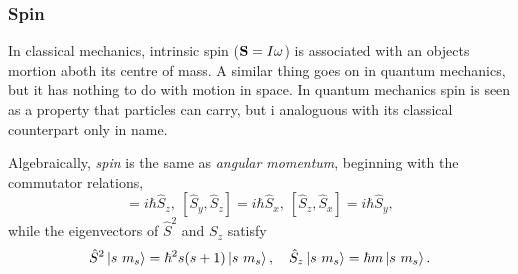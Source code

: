     \subsubsection{Spin}

    In classical mechanics, intrinsic spin ($\vb{S} = I\omega$) is associated with
    an objects mortion aboth its centre of mass. A similar thing goes on in quantum 
    mechanics, but it has nothing to do with motion in space. In quantum mechanics spin 
    is seen as a property that particles can carry, but i analoguous with its classical 
    counterpart only in name.

    Algebraically, \emph{spin} is the same as \emph{angular momentum}, beginning with 
    the commutator relations,
    \begin{equation}
        [\hat{S}_x, \hat{S}_y] = i\hbar \hat{S}_z, \ 
        [\hat{S}_y, \hat{S}_z] = i\hbar \hat{S}_x, \ 
        [\hat{S}_z, \hat{S}_x] = i\hbar \hat{S}_y,
    \end{equation}
    while the eigenvectors of $\hat{S}^2$ and $S_z$ satisfy 
    \begin{equation}
        \hat{S}^2\ket{s\ m_s} = \hbar^2 s(s + 1)\ket{s\ m_s}, \quad
        \hat{S}_z\ket{s\ m_s} = \hbar m \ket{s\ m_s}.
    \end{equation}
   
